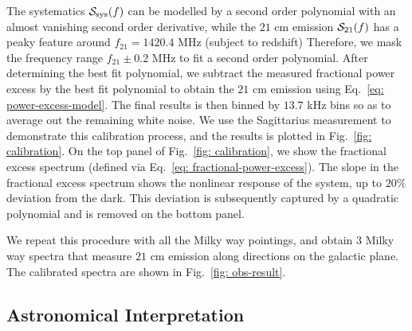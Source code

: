 \documentclass[12pt]{article}
\begin{document}
    The systematics $\mathcal{S}_{\rm sys}(f)$ can be modelled by a second order polynomial with an almost vanishing second order derivative, while the $21$ cm emission $\mathcal{S}_{\rm 21}(f)$ has a peaky feature around $f_{21} = 1420.4$ MHz (subject to redshift)
    Therefore, we mask the frequency range $f_{21} \pm 0.2 $ MHz to fit a second order polynomial.
    After determining the best fit polynomial, we subtract the measured fractional power excess by the best fit polynomial to obtain the $21$ cm emission using Eq.~\ref{eq: power-excess-model}.
    The final results is then binned by $13.7$ kHz bins so as to average out the remaining white noise.
    We use the Sagittarius measurement to demonstrate this calibration process, and the results is plotted in Fig.~\ref{fig: calibration}.
    On the top panel of Fig.~\ref{fig: calibration}, we show the fractional excess spectrum (defined via Eq.~\ref{eq: fractional-power-excess}). 
    The slope in the fractional excess spectrum shows the nonlinear response of the system, up to $20\%$ deviation from the dark. 
    This deviation is subsequently captured by a quadratic polynomial and is removed on the bottom panel.

    We repeat this procedure with all the Milky way pointings, and obtain $3$ Milky way spectra that measure $21$ cm emission along directions on the galactic plane.
    The calibrated spectra are shown in Fig.~\ref{fig: obs-result}.
    
    \subsection{Astronomical Interpretation}
\end{document}

